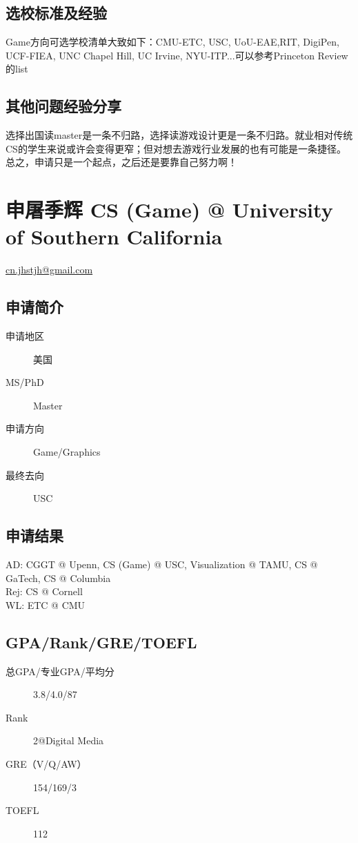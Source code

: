 \documentclass[11pt,fleqn,openany]{book} %
\begin{document}
\subsection*{选校标准及经验}
Game方向可选学校清单大致如下：CMU-ETC, USC, UoU-EAE,RIT, DigiPen, UCF-FIEA, UNC Chapel Hill, UC Irvine, NYU-ITP...可以参考Princeton Review的list
\subsection*{其他问题经验分享}
选择出国读master是一条不归路，选择读游戏设计更是一条不归路。就业相对传统CS的学生来说或许会变得更窄；但对想去游戏行业发展的也有可能是一条捷径。总之，申请只是一个起点，之后还是要靠自己努力啊！
\clearpage
\section{申屠季辉 CS (Game) @ University of Southern California}
\hfill \href{mailto:cn.jhstjh@gmail.com}{cn.jhstjh@gmail.com}

\noindent\begin{minipage}[t]{0.45\textwidth}
\subsection*{申请简介}
\begin{description}
\item[申请地区] 美国
\item[MS/PhD] Master
\item[申请方向] Game/Graphics
\item[最终去向] USC
\end{description}
\end{minipage}
\hfill
\begin{minipage}[t]{0.45\textwidth}
\subsection*{申请结果}
\noindent AD: CGGT @ Upenn, CS (Game) @ USC, Visualization @ TAMU, CS @ GaTech, CS @ Columbia\\
Rej: CS @ Cornell\\
WL: ETC @ CMU
\end{minipage}
\subsection*{GPA/Rank/GRE/TOEFL}
\begin{description}
\item[总GPA/专业GPA/平均分] 3.8/4.0/87
\item[Rank] 2@Digital Media
\item[GRE（V/Q/AW）] 154/169/3
\item[TOEFL] 112
\end{description}
\end{document}
